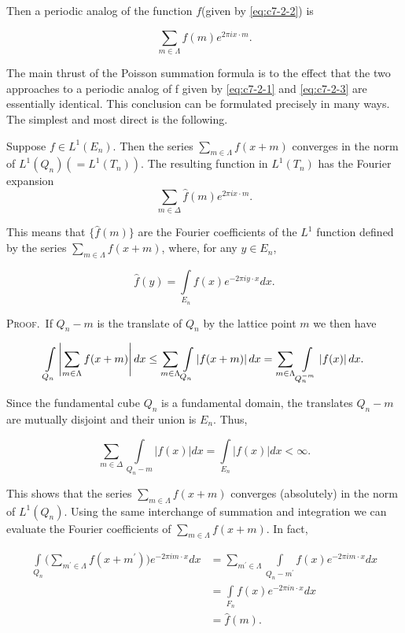 Then a periodic analog of the function $f$(given by \eqref{eq:c7-2-2}) is

\begin{equation}\label{eq:c7-2-3}
\sum_{m\in\Lambda}\hat{f}(m)e^{2\pi i x\cdot m}.
\end{equation}

The main thrust of the Poisson summation formula is to the effect that the two approaches to a periodic analog of f given by \eqref{eq:c7-2-1} and \eqref{eq:c7-2-3} are essentially identical. This conclusion can be formulated precisely in many ways. The simplest and most direct is the following.

\begin{theorem}
\label{thm:c7-2-4}
Suppose $f \in L^1(E_n)$. Then the series $\sum_{m \in \Lambda} f(x + m)$ converges in the norm of $L^1(Q_n) (= L^1(T_n))$. The resulting function in $L^1(T_n)$ has the Fourier expansion
\begin{equation}\label{eq:c7-2-5}
\sum_{m\in\Delta}\hat{f}(m)e^{2\pi i x\cdot m}.
\end{equation}

\end{theorem}

This means that $\{ \hat{f}(m) \}$ are the Fourier coefficients of the $L^{1}$ function defined by the series $\sum_{m \in \Lambda} f(x + m)$, where, for any $y \in E_n$,

\[
\hat{f}(y)=\int\limits_{E_{n}}f(x)e^{-2\pi i y\cdot x}d x.
\]

\textsc{Proof.}\ If $Q_{n}-m$ is the translate of $Q_{n}$ by the lattice point $m$ we then have

\[
\int\limits_{Q_{n}}\left|\sum_{m\in\Lambda}f(x+m)\right|d x\leq\sum_{m\in\Lambda}\int\limits_{Q_{n}}\left|f(x+m)\right|d x=\sum_{m\in\Lambda}\intop_{Q_{n}^{-m}}\left|f(x)\right|d x.
\]

Since the fundamental cube $Q_{n}$ is a fundamental domain, the translates $Q_{n} - m$ are mutually disjoint and their union is $E_{n}$. Thus,

\[
\sum_{m\in\Delta}\int\limits_{Q_{n}-m}\left|f(x)\right|dx=\int\limits_{E_{n}}\left|f(x)\right|dx<\infty.
\]

This shows that the series $\sum_{m \in \Lambda} f(x + m)$ converges (absolutely) in the norm of $L^1(Q_n)$. Using the same interchange of summation and integration we can evaluate the Fourier coefficients of $\sum_{m \in \Lambda} f(x + m)$. In fact,

\[
\begin{aligned}\int\limits_{Q_{n}}\Big(\sum_{m^{\prime}\in\Lambda}f(x+m^{\prime})\Big)e^{-2\pi i m\cdot x}dx&=\sum_{m^{\prime}\in\Lambda}\int\limits_{Q_{n}-m^{\prime}}f(x)e^{-2\pi i m\cdot x}dx\\&=\int\limits_{F_{n}}f(x)e^{-2\pi i n\cdot x}dx\\&=\hat{f}(m).\end{aligned}
\]

